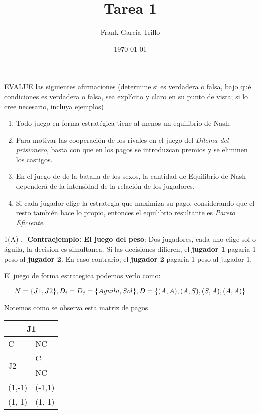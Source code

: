 \documentclass{homework}
\author{Frank Garcia Trillo}
\date{\today}
\title{Tarea 1}
\begin{document}
 \maketitle


\question EVALUE las siguientes afirmaciones (determine si es verdadera o falsa, bajo qué condiciones es verdadera o falsa, sea explícito y claro en su punto de vista; si lo cree necesario, incluya ejemplos)

\begin{enumerate}
    \item Todo juego en forma estratégica tiene al menos un equilibrio de Nash.
    \item Para motivar las cooperación de los rivales en el juego del \textit{Dilema del prisionero}, basta con que en los pagos se introduzcan premios y se eliminen los castigos.
    \item En el juego de de la batalla de los sexos, la cantidad de Equilibrio de Nash dependerá de la intensidad de la relación de los jugadores.
    \item Si cada jugador elige la estrategia que maximiza su pago, considerando que el resto también hace lo propio, entonces el equilibrio resultante es \textit{Pareto Eficiente}.
\end{enumerate}


1(A) .- \textbf{Contraejemplo: El juego del peso}:
Dos jugadores, cada uno elige sol o águila, la decision es simultanea. Si las decisiones difieren, el \textbf{jugador 1} pagaria 1 peso al \textbf{jugador 2}. En caso contrario, el \textbf{jugador 2} pagaria 1 peso al jugador 1.

El juego de forma estrategica podemos verlo como:

\begin{equation}
    N = \{ J1, J2 \},  \\
    D_i = D_j = \{ Aguila, Sol \},  \\
    D = \{ (A,A), (A,S), (S,A), (A,A) \} 
\end{equation}

Notemos como se observa esta matriz de pagos.
\centering
\begin{tabular}{ll}
\hline
\multicolumn{2}{|c|}{J1} \\ \hline
C & NC \\ \hline
\hline
    \multirow{2}{}{J2}& C\\
    & NC\\ \hline

(1,-1) & (-1,1) \\
(1,-1)  & (1,-1) 
\end{tabular}
\end{document}
